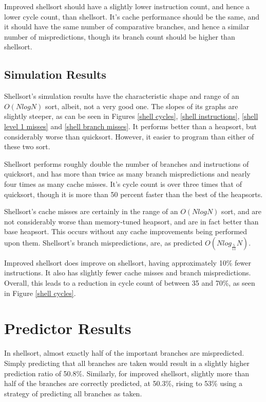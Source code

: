 Improved shellsort should have a slightly lower instruction count, and hence a
lower cycle count, than shellsort. It's cache performance should be the same,
and it should have the same number of comparative branches, and hence a similar
number of mispredictions, though its branch count should be higher than
shellsort.


\subsection{Simulation Results}

Shellsort's simulation results have the characteristic shape and range of an
$O(NlogN)$ sort, albeit, not a very good one. The slopes of its graphs are
slightly steeper, as can be seen in Figures \ref{shell cycles}, \ref{shell
instructions}, \ref{shell level 1 misses} and \ref{shell branch misses}. It
performs better than a heapsort, but considerably worse than quicksort. However,
it easier to program than either of these two sort.

Shellsort performs roughly double the number of branches and instructions of
quicksort, and has more than twice as many branch mispredictions and nearly
four times as many cache misses. It's cycle count is over three times that of
quicksort, though it is more than 50 percent faster than the best of the
heapsorts.

Shellsort's cache misses are certainly in the range of an $O(NlogN)$ sort, and
are not considerably worse than memory-tuned heapsort, and are in fact better
than base heapsort. This occurs without any cache improvements being performed
upon them.  Shellsort's branch mispredictions, are, as predicted
$O(Nlog_{\frac{5}{11}}N)$. 

Improved shellsort does improve on shellsort, having approximately 10\% fewer
instructions. It also has slightly fewer cache misses and branch mispredictions.
Overall, this leads to a reduction in cycle count of between 35 and 70\%, as
seen in Figure \ref{shell cycles}.

\section{Predictor Results}


In shellsort, almost exactly half of the important branches are mispredicted.
Simply predicting that all branches are taken would result in a slightly higher
prediction ratio of 50.8\%. Similarly, for improved shellsort, slightly more
than half of the branches are correctly predicted, at 50.3\%, rising to 53\%
using a strategy of predicting all branches as taken.

